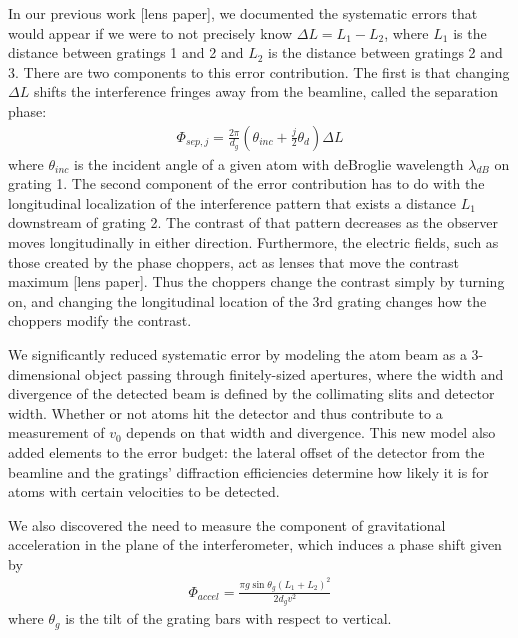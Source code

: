 \documentclass[12pt,letterpaper]{article}
\begin{document}
In our previous work [lens paper], we documented the systematic errors that would appear if we were to not precisely know $\Delta L = L_1 - L_2$, where $L_1$ is the distance between gratings 1 and 2 and $L_2$ is the distance between gratings 2 and 3. There are two components to this error contribution. The first is that changing $\Delta L$ shifts the interference fringes away from the beamline, called the separation phase:
\begin{align}
	\Phi_{sep,j} = \frac{2\pi}{d_g}
	\left(
		\theta_{inc} + \frac{j}{2}\theta_d
	\right) \Delta L
	\label{phiSep}
\end{align}
where $\theta_{inc}$ is the incident angle of a given atom with deBroglie wavelength $\lambda_{dB}$ on grating 1. The second component of the error contribution has to do with the longitudinal localization of the interference pattern that exists a distance $L_1$ downstream of grating 2. The contrast of that pattern decreases as the observer moves longitudinally in either direction. Furthermore, the electric fields, such as those created by the phase choppers, 
act as lenses that move the contrast maximum [lens paper]. Thus the choppers change the contrast simply by turning on, and changing the longitudinal location of the 3rd grating changes how the choppers modify the contrast. 

We significantly reduced systematic error by modeling the atom beam as a 3-dimensional object passing through finitely-sized apertures, where the width and divergence of the detected beam is defined by the collimating slits and detector width. Whether or not atoms hit the detector and thus contribute to a measurement of $v_0$ depends on that width and divergence. This new model also added elements to the error budget: the lateral offset of the detector from the beamline and the gratings' diffraction efficiencies determine how likely it is for atoms with certain velocities to be detected.

We also discovered the need to measure the component of gravitational acceleration in the plane of the interferometer, which induces a phase shift given by
\begin{align}
	\Phi_{accel} = \frac{\pi g\sin{\theta_g}(L_1+L_2)^2}{2d_g v^2}
	\label{phiAccel}
\end{align}
where $\theta_g$ is the tilt of the grating bars with respect to vertical.
\end{document}

